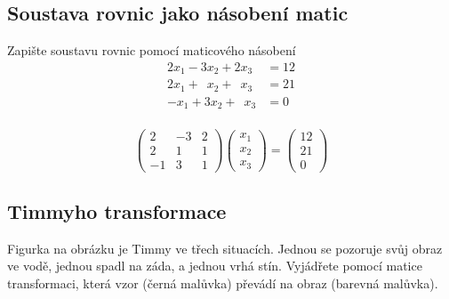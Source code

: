 \stranka

\subsection{Soustava rovnic jako násobení matic}

Zapište soustavu rovnic pomocí maticového násobení
\begin{equation*}
  \begin{aligned}
2x_1-3x_2+2x_3&{}=12\\
2x_1+\phantom{1}x_2+\phantom{1}x_3&{}=21\\
-x_1+3x_2+\phantom{1}x_3&{}=0\\
\end{aligned}
\end{equation*}

\reseni
\begin{equation*}
  \begin{pmatrix}
  2 & -3 & 2 \\ 2 & 1 & 1 \\ -1 & 3& 1
\end{pmatrix}
\begin{pmatrix}
  x_1\\x_2\\x_3
\end{pmatrix}
=
\begin{pmatrix}
  12\\21\\0
\end{pmatrix}
\end{equation*}
\konec

\stranka

\def\tg{\mathop{\mathrm{tg}}}
\def\cotg{\mathop{\mathrm{cotg}}}
\def\arctg{\mathop{\mathrm{arctg}}}


\stranka

\subsection{Timmyho transformace}

Figurka na obrázku je Timmy ve třech situacích. Jednou se pozoruje svůj obraz ve vodě, jednou spadl na záda, a jednou vrhá stín. Vyjádřete pomocí matice transformaci, která vzor (černá malůvka) převádí na obraz (barevná malůvka).

\def\timyscale{0.7}

